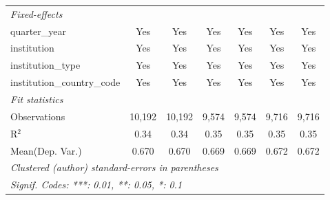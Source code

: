 \begin{tabular}{lcccccc}
   \midrule
   \emph{Fixed-effects}\\
   quarter\_year                      & Yes     & Yes      & Yes     & Yes         & Yes     & Yes\\  
   institution                        & Yes     & Yes      & Yes     & Yes         & Yes     & Yes\\  
   institution\_type                  & Yes     & Yes      & Yes     & Yes         & Yes     & Yes\\  
   institution\_country\_code         & Yes     & Yes      & Yes     & Yes         & Yes     & Yes\\  
   \midrule
   \emph{Fit statistics}\\
   Observations                       & 10,192  & 10,192   & 9,574   & 9,574       & 9,716   & 9,716\\  
   R$^2$                              & 0.34    & 0.34     & 0.35    & 0.35        & 0.35    & 0.35\\  
Mean(Dep. Var.) & 0.670 & 0.670 & 0.669 & 0.669 & 0.672 & 0.672 \\
   \midrule \midrule
   \multicolumn{7}{l}{\emph{Clustered (author) standard-errors in parentheses}}\\
   \multicolumn{7}{l}{\emph{Signif. Codes: ***: 0.01, **: 0.05, *: 0.1}}\\
\end{tabular}
\par\endgroup
